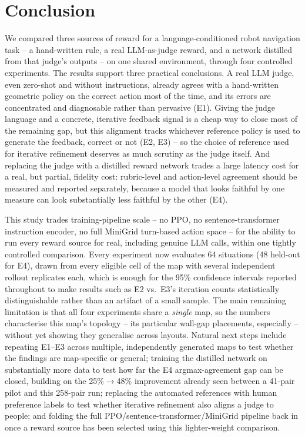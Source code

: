 \documentclass[10pt,twocolumn]{article}
\begin{document}
\section{Conclusion}
\label{sec:conclusion}

We compared three sources of reward for a language-conditioned robot
navigation task -- a hand-written rule, a real LLM-as-judge reward, and
a network distilled from that judge's outputs -- on one shared
environment, through four controlled experiments. The results support
three practical conclusions. A real LLM judge, even zero-shot and
without instructions, already agrees with a hand-written geometric
policy on the correct action most of the time, and its errors are
concentrated and diagnosable rather than pervasive (E1). Giving the
judge language and a concrete, iterative feedback signal is a cheap way
to close most of the remaining gap, but this alignment tracks whichever
reference policy is used to generate the feedback, correct or not (E2,
E3) -- so the choice of reference used for iterative refinement deserves
as much scrutiny as the judge itself. And replacing the judge with a
distilled reward network trades a large latency cost for a real, but
partial, fidelity cost: rubric-level and action-level agreement should
be measured and reported separately, because a model that looks faithful
by one measure can look substantially less faithful by the other (E4).

This study trades training-pipeline scale -- no PPO, no
sentence-transformer instruction encoder, no full MiniGrid turn-based
action space -- for the ability to run every reward source for real,
including genuine LLM calls, within one tightly controlled comparison.
Every experiment now evaluates 64 situations (48 held-out for E4),
drawn from every eligible cell of the map with several independent
rollout replicates each, which is enough for the 95\% confidence
intervals reported throughout to make results such as E2 vs.\ E3's
iteration counts statistically distinguishable rather than an artifact
of a small sample. The main remaining limitation is that all four
experiments share a \emph{single} map, so the numbers characterise this
map's topology -- its particular wall-gap placements, especially --
without yet showing they generalise across layouts. Natural next steps
include repeating E1--E3 across multiple, independently generated maps
to test whether the findings are map-specific or general; training the
distilled network on substantially more data to test how far the E4
argmax-agreement gap can be closed, building on the 25\%$\to$48\%
improvement already seen between a 41-pair pilot and this 258-pair run;
replacing the automated references with human preference labels to test
whether iterative refinement also aligns a judge to people; and folding
the full PPO/sentence-transformer/MiniGrid pipeline back in once a
reward source has been selected using this lighter-weight comparison.

\begingroup
\footnotesize


\endgroup
\end{document}
